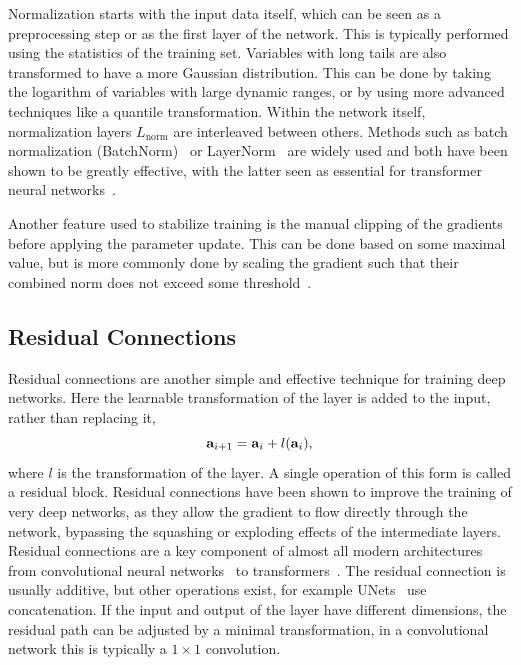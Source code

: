 Normalization starts with the input data itself, which can be seen as a preprocessing step or as the first layer of the network.
This is typically performed using the statistics of the training set.
Variables with long tails are also transformed to have a more Gaussian distribution.
This can be done by taking the logarithm of variables with large dynamic ranges, or by using more advanced techniques like a quantile transformation.
Within the network itself, normalization layers $L_{\text{norm}}$ are interleaved between others.
Methods such as batch normalization (BatchNorm)~\cite{BatchNorm} or \Gls{LayerNorm}~\cite{LayerNorm} are widely used and both have been shown to be greatly effective, with the latter seen as essential for transformer neural networks~\cite{Attention}.

Another feature used to stabilize training is the manual clipping of the gradients before applying the parameter update.
This can be done based on some maximal value, but is more commonly done by scaling the gradient such that their combined norm does not exceed some threshold~\cite{WhyGradientClipping}.

\subsection{Residual Connections}

Residual connections are another simple and effective technique for training deep networks.
Here the learnable transformation of the layer is added to the input, rather than replacing it,
\begin{equation}
    \mathbf{a}_{i+1} = \mathbf{a}_i + l(\mathbf{a}_i),
\end{equation}
where $l$ is the transformation of the layer.
A single operation of this form is called a residual block.
Residual connections have been shown to improve the training of very deep networks, as they allow the gradient to flow directly through the network, bypassing the squashing or exploding effects of the intermediate layers.
Residual connections are a key component of almost all modern architectures from convolutional neural networks~\cite{ResNet} to transformers~\cite{Attention}.
The residual connection is usually additive, but other operations exist, for example UNets~\cite{Unet} use concatenation.
If the input and output of the layer have different dimensions, the residual path can be adjusted by a minimal transformation, in a convolutional network this is typically a $1 \times 1$ convolution.

